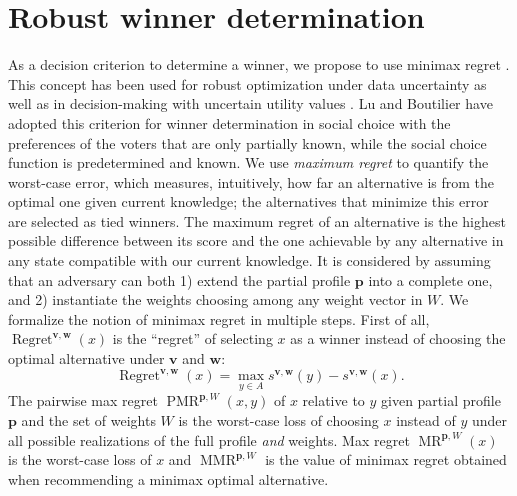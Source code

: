 \documentclass[a4paper,twoside]{article}
\newcommand{\profile}{\bm{v}}%
\newcommand{\pprofile}{{\bm{p}}}%
\newcommand{\w}{\bm{w}}
\newcommand{\pw}{W}%
\DeclareMathOperator{\Regret}{Regret}
\DeclareMathOperator{\PMR}{PMR}
\DeclareMathOperator{\MR}{MR}
\DeclareMathOperator{\MMR}{MMR}
\begin{document}
\section[Minimax regret under partial profile and weight information]{
Robust winner determination}
\label{sec:mmr}
As a decision criterion to determine a winner, we propose to use minimax regret \cite{Savage1954}. This concept has been used for robust optimization under data uncertainty \cite{Kouvelis1997} as well as in decision-making with uncertain utility values \cite{Salo2001,Boutilier2006}. Lu and Boutilier \cite{Lu2011} have adopted this criterion for winner determination in social choice with the preferences of the voters that are only partially known, while the social choice function is predetermined and known.
We use {\em maximum regret} to quantify the worst-case error, which measures, intuitively, how far an alternative is from the optimal one given current knowledge; 
the alternatives that minimize this error are selected as tied winners.
The maximum regret of an alternative is the highest possible difference between its score and the one achievable by any alternative in any state compatible with our current knowledge.
It is considered by assuming that an adversary can both 1) extend the partial profile $\pprofile$ into a complete one, and 2) instantiate the weights choosing among any weight vector in $\pw$.
We formalize the notion of minimax regret in multiple steps.
First of all, $\Regret^{\profile,\w}(x)$ is the “regret” of selecting $x$ as a winner instead of choosing the optimal alternative under $\profile$ and $\w$:
\[\Regret^{\profile,\w}(x) = \max_{y \in A} s^{\profile,\w}(y) - s^{\profile, \w}(x).\]
The pairwise max regret $\PMR^{\pprofile,W}(x,y)$ of $x$ relative to $y$ given partial profile $\pprofile$ and the set of weights $W$ is the worst-case loss of choosing $x$ instead of $y$ under all possible realizations of the full profile {\em and} weights. Max regret $\MR^{\pprofile,W}(x)$ is the worst-case loss of $x$ and $\MMR^{\pprofile,W}$ is the value of minimax regret obtained when recommending a minimax optimal alternative. 
\end{document}
